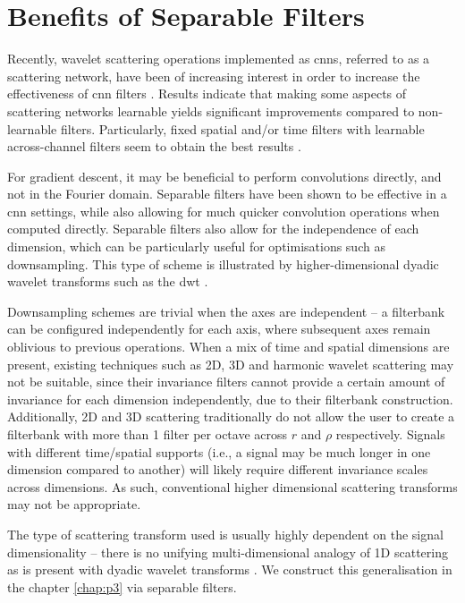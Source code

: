 \section{Benefits of Separable Filters}
\label{sec:p3i:sep}

Recently, wavelet scattering operations implemented as \acp{cnn}, referred to as a scattering network, have been of increasing interest in order to increase the effectiveness of \ac{cnn} filters \cite{2dscattering, scattering_birdsong}. Results indicate that making some aspects of scattering networks learnable yields significant improvements compared to non-learnable filters. Particularly, fixed spatial and/or time filters with learnable across-channel filters seem to obtain the best results \cite{nnphasecollapse}.

For gradient descent, it may be beneficial to perform convolutions directly, and not in the Fourier domain. Separable filters have been shown to be effective in a \ac{cnn} settings, while also allowing for much quicker convolution operations \cite{separablecnn,separablecnn2} when computed directly. Separable filters also allow for the independence of each dimension, which can be particularly useful for optimisations such as downsampling. This type of scheme is illustrated by higher-dimensional dyadic wavelet transforms such as the \ac{dwt} \cite{waveletbook}.

Downsampling schemes are trivial when the axes are independent -- a filterbank can be configured independently for each axis, where subsequent axes remain oblivious to previous operations. When a mix of time and spatial dimensions are present, existing techniques such as 2D, 3D and harmonic wavelet scattering may not be suitable, since their invariance filters cannot provide a certain amount of invariance for each dimension independently, due to their filterbank construction. Additionally, 2D and 3D scattering traditionally do not allow the user to create a filterbank with more than 1 filter per octave across $r$ and $\rho$ respectively. Signals with different time/spatial supports (i.e., a signal may be much longer in one dimension compared to another) will likely require different invariance scales across dimensions. As such, conventional higher dimensional scattering transforms may not be appropriate. 

The type of scattering transform used is usually highly dependent on the signal dimen\-sionality -- there is no unifying multi-dimensional analogy of 1D scattering as is present with dyadic wavelet transforms \citep{waveletbook}. We construct this generalisation in the chapter \ref*{chap:p3} via separable filters.


